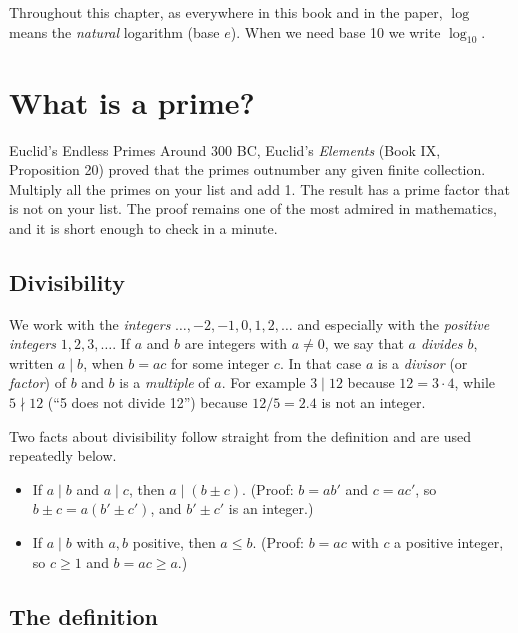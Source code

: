 Throughout this chapter, as everywhere in this book and in the paper, $\log$ means the \emph{natural} logarithm (base $e$). When we need base 10 we write $\log_{10}$.

\section{What is a prime?}\label{sec:primes-definition}
\begin{didyouknow}{Euclid's Endless Primes}
Around 300 BC, Euclid's \emph{Elements} (Book IX, Proposition 20) proved that the primes outnumber any given finite collection. Multiply all the primes on your list and add 1. The result has a prime factor that is not on your list. The proof remains one of the most admired in mathematics, and it is short enough to check in a minute.
\end{didyouknow}

\subsection{Divisibility}

We work with the \emph{integers} $\dots,-2,-1,0,1,2,\dots$ and especially with the \emph{positive integers} $1,2,3,\dots$. If $a$ and $b$ are integers with $a\neq0$, we say that \emph{$a$ divides $b$}, written $a\mid b$, when $b=ac$ for some integer $c$. In that case $a$ is a \emph{divisor} (or \emph{factor}) of $b$ and $b$ is a \emph{multiple} of $a$. For example $3\mid 12$ because $12=3\cdot4$, while $5\nmid 12$ (``5 does not divide 12'') because $12/5=2.4$ is not an integer.

Two facts about divisibility follow straight from the definition and are used repeatedly below.
\begin{itemize}
\item If $a\mid b$ and $a\mid c$, then $a\mid(b\pm c)$. (Proof: $b=ab'$ and $c=ac'$, so $b\pm c=a(b'\pm c')$, and $b'\pm c'$ is an integer.)
\item If $a\mid b$ with $a,b$ positive, then $a\le b$. (Proof: $b=ac$ with $c$ a positive integer, so $c\ge1$ and $b=ac\ge a$.)
\end{itemize}

\subsection{The definition}

